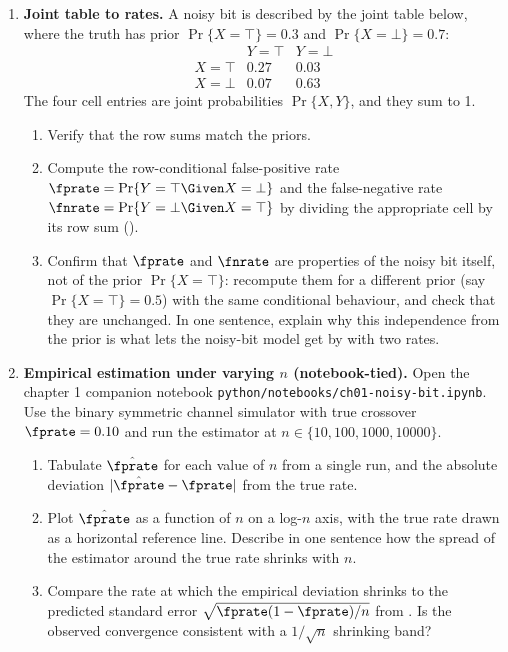 \begin{enumerate}
\item \exstar
\label{ex:ch1-3}
\textbf{Joint table to rates.}
A noisy bit is described by the joint table below, where the truth has
prior $\Pr\{X = \top\} = 0.3$ and $\Pr\{X = \bot\} = 0.7$:
\[
  \begin{array}{c|cc}
    & Y = \top & Y = \bot \\\hline
    X = \top & 0.27 & 0.03 \\
    X = \bot & 0.07 & 0.63
  \end{array}
\]
The four cell entries are joint probabilities $\Pr\{X, Y\}$, and they sum
to 1.
\begin{enumerate}
  \item[(a)] Verify that the row sums match the priors.
  \item[(b)] Compute the row-conditional false-positive rate $\fprate =
    \Pr\{Y = \top \Given X = \bot\}$ and the false-negative rate
    $\fnrate = \Pr\{Y = \bot \Given X = \top\}$ by dividing the
    appropriate cell by its row sum ().
  \item[(c)] Confirm that $\fprate$ and $\fnrate$ are properties of the
    noisy bit itself, not of the prior $\Pr\{X = \top\}$: recompute
    them for a different prior (say $\Pr\{X = \top\} = 0.5$) with the
    same conditional behaviour, and check that they are unchanged. In
    one sentence, explain why this independence from the prior is what
    lets the noisy-bit model get by with two rates.
\end{enumerate}


\item \exstarstar
\label{ex:ch1-4}
\textbf{Empirical estimation under varying $n$ (notebook-tied).}
Open the chapter 1 companion notebook
\texttt{python/notebooks/ch01-noisy-bit.ipynb}. Use the binary symmetric
channel simulator with true crossover $\fprate = 0.10$ and run the
estimator at $n \in \{10, 100, 1000, 10000\}$.
\begin{enumerate}
  \item[(a)] Tabulate $\hat{\fprate}$ for each value of $n$ from a single
    run, and the absolute deviation $|\hat{\fprate} - \fprate|$ from
    the true rate.
  \item[(b)] Plot $\hat{\fprate}$ as a function of $n$ on a log-$n$
    axis, with the true rate drawn as a horizontal reference line.
    Describe in one sentence how the spread of the estimator around
    the true rate shrinks with $n$.
  \item[(c)] Compare the rate at which the empirical deviation shrinks
    to the predicted standard error
    $\sqrt{\fprate(1-\fprate)/n}$ from .
    Is the observed convergence consistent with a $1/\sqrt{n}$ shrinking
    band?
\end{enumerate}


\end{enumerate}

